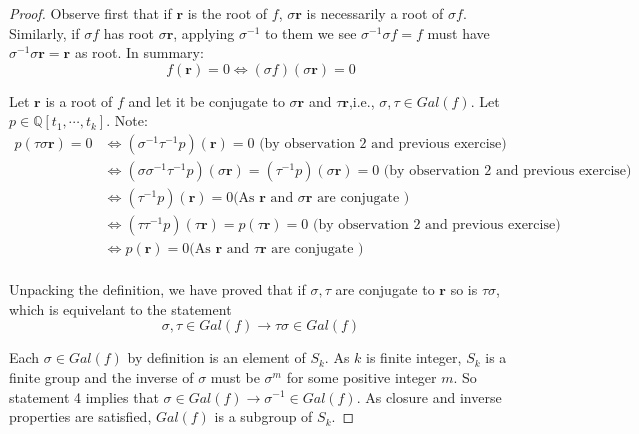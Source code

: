 \documentclass{article}
\theoremstyle{definition}
\theoremstyle{definition}
\theoremstyle{remark}
\newcommand{\bb}[1]{\mathbb{#1}} %
\begin{document}
\begin{proof}

	Observe first that if $\bm{r}$ is the root of $f$, $\sigma\bm{r}$ is necessarily a root of $\sigma f$. Similarly, if $\sigma f$ has root $\sigma \bm{r}$, applying $\sigma^{-1}$ to them we see $\sigma^{-1} \sigma f = f$ must have $\sigma^{-1} \sigma \bm{r} = \bm{r}$ as root.
	In summary:
	\begin{equation}
		f(\bm{r}) = 0 \iff   (\sigma f)(\sigma \bm{ r}) = 0
	\end{equation}


	Let $\bm{r}$ is a root of $f$ and let it be conjugate to $\sigma \bm{r}$ and $\tau \bm{r}$,i.e., $\sigma, \tau\in Gal(f)$. 
	Let $p \in \bb{Q}[t_1, \cdots, t_k]$. 
	Note:
	\begin{equation}
		\begin{split}
		p(\tau \sigma \bm{r}) = 0 
		&\iff (\sigma^{-1} \tau^{-1}p)( \bm{r}) =  0  \text{ (by observation 2 and previous exercise)}\\
		&\iff (\sigma \sigma^{-1} \tau^{-1}p)(\sigma \bm{r}) = (\tau^{-1} p)(\sigma \bm{r}) = 0    \text{ (by observation 2 and previous exercise)}\\
		&\iff (\tau^{-1} p)(\bm{r}) = 0 \text{(As $\bm{r}$ and $\sigma \bm{r}$ are conjugate )} \\
		&\iff  (\tau \tau^{-1}p)(\tau \bm{r}) = p(\tau \bm{r})= 0 \text{ (by observation 2 and previous exercise)} \\
		&\iff p(\bm{r}) = 0 \text{(As $\bm{r}$ and $\tau \bm{r}$ are conjugate )} \\
		\end{split}
	\end{equation}

	Unpacking the definition, we have proved that if $\sigma, \tau$ are conjugate to $\bm{r}$ so is $\tau \sigma$, which is equivelant to the statement 
	\begin{equation}
		\sigma, \tau \in Gal(f) \rightarrow \tau \sigma \in Gal(f)
	\end{equation}
		
	Each $\sigma \in Gal(f)$ by definition is an element of $S_k$.
	As $k$ is finite integer, $S_k$ is a finite group and the inverse of $\sigma$ must be $\sigma^m$ for some positive integer $m$. 
	So statement 4 implies that $\sigma \in Gal(f) \rightarrow \sigma^{-1} \in Gal(f)$.
	As closure and inverse properties are satisfied, $Gal(f)$ is a subgroup of $S_k$.

\end{proof}
\end{document}
